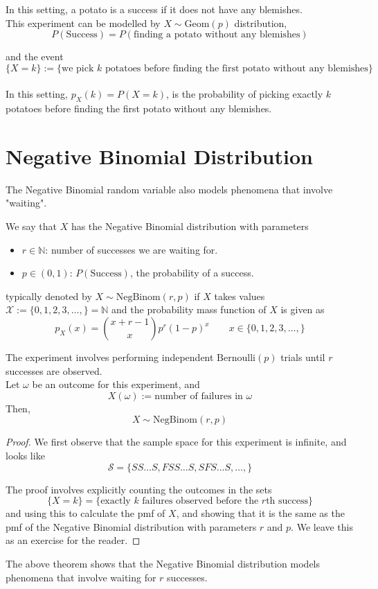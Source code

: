 \begin{enumerate}
    In this setting, a potato is a success if it does not have any blemishes. 
    \\
    This experiment can be modelled by $X\sim \text{Geom}(p)$ distribution, 
    $$P(\text{Success}) = P(\text{finding a potato without any blemishes})$$
    
    and the event 
    $$\{X=k\} := \{\text{we pick $k$ potatoes before finding the first potato without any blemishes}\}$$
    \\
    In this setting, $p_X(k) = P(X=k)$, is the probability of picking exactly $k$  potatoes before finding the first potato without any blemishes. 
\end{enumerate}


\section{Negative Binomial Distribution}
The Negative Binomial random variable also models phenomena that involve "waiting". 

\begin{defn}
    We say that $X$ has the Negative Binomial distribution with parameters
    \begin{itemize}
    \item $r \in \mathbb{N}$: number of successes we are waiting for.
        \item $p\in (0,1)$: $P(\text{Success})$, the probability of a success. 
    \end{itemize}
    typically denoted by $X \sim \text{NegBinom}(r, p)$ if $X$ takes values $\mathcal{X}:= \{0, 1, 2, 3, \dots, \} = \mathbb{N}$ and the probability mass function of $X$ is given as
    $$p_X(x) = {x+r-1 \choose x}p^r(1-p)^x\quad \quad x\in \{0,1, 2, 3, \dots, \}$$
\end{defn}


\begin{thm}
    The experiment involves performing independent $\text{Bernoulli}(p)$ trials until $r$ successes are observed.  
    \\  
    Let $\omega$ be an outcome for this experiment, and $$X(\omega) := \text{number of failures in $\omega$}$$
    Then, 
    $$X \sim \text{NegBinom}(r, p)$$
\end{thm}
\begin{proof}
We first observe that the sample space for this experiment is infinite, and looks like
$$ \mathcal{S} = \{SS\dots S, FSS\dots S, SFS\dots S, \dots , \}$$

The proof involves explicitly counting the outcomes in the sets 
$$\{X = k\} = \{\text{exactly $k$ failures observed before the $r$th success}\}$$ 
and using this to calculate the pmf of $X$, and showing that it is the same as the pmf of the Negative Binomial distribution with parameters $r$ and $p$. We leave this as an exercise for the reader. 
\end{proof}
The above theorem shows that the Negative Binomial distribution models phenomena that involve waiting for $r$ successes. 



